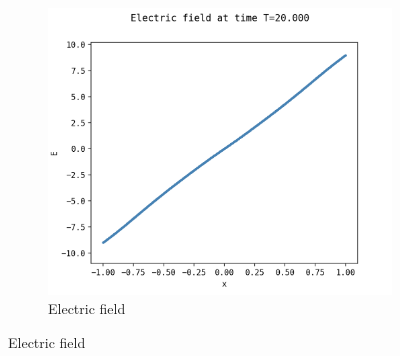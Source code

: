 \documentclass{article}
\numberwithin{equation}{section}
\newcommand{\imh}{\textheight} %
\newcommand{\imw}{\textwidth} %
\begin{document}
\begin{figure}
\begin{subfigure}{\textwidth}
		\includegraphics[height=\imh,width=\imw]{images/ET20_512_3.png}
		\caption{Electric field }
		\label{subfig:compT02_E}
	\end{subfigure}


\end{figure}
\end{document}
